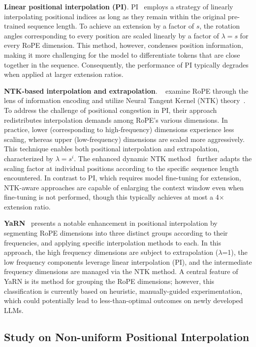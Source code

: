 \textbf{Linear positional interpolation (PI)}. PI~\cite{pi} employs a strategy of linearly interpolating positional indices as long as they remain within the original pre-trained sequence length. To achieve an extension by a factor of $s$, the rotation angles corresponding to every position are scaled linearly by a factor of $\lambda = s$ for every RoPE dimension. This method, however, condenses position information, making it more challenging for the model to differentiate tokens that are close together in the sequence. Consequently, the performance of PI typically degrades when applied at larger extension ratios.

\textbf{NTK-based interpolation and extrapolation}. ~\cite{ntk,dynamicntk} examine RoPE through the lens of information encoding and utilize Neural Tangent Kernel (NTK) theory~\cite{jacot2018neural,tancik2020fourier}. To address the challenge of positional congestion in PI, their approach redistributes interpolation demands among RoPE’s various dimensions. In practice, lower (corresponding to high-frequency) dimensions experience less scaling, whereas upper (low-frequency) dimensions are scaled more aggressively. This technique enables both positional interpolation and extrapolation, characterized by $\lambda=s^{i}$. The enhanced dynamic NTK method~\cite{dynamicntk} further adapts the scaling factor at individual positions according to the specific sequence length encountered. In contrast to PI, which requires model fine-tuning for extension, NTK-aware approaches are capable of enlarging the context window even when fine-tuning is not performed, though this typically achieves at most a 4$\times$ extension ratio.

\textbf{YaRN}~\cite{yarn} presents a notable enhancement in positional interpolation by segmenting RoPE dimensions into three distinct groups according to their frequencies, and applying specific interpolation methods to each. In this approach, the high frequency dimensions are subject to extrapolation ($\lambda$=1), the low frequency components leverage linear interpolation (PI), and the intermediate frequency dimensions are managed via the NTK method. A central feature of YaRN is its method for grouping the RoPE dimensions; however, this classification is currently based on heuristic, manually-guided experimentation, which could potentially lead to less-than-optimal outcomes on newly developed LLMs.

\subsection{Study on Non-uniform Positional Interpolation}

